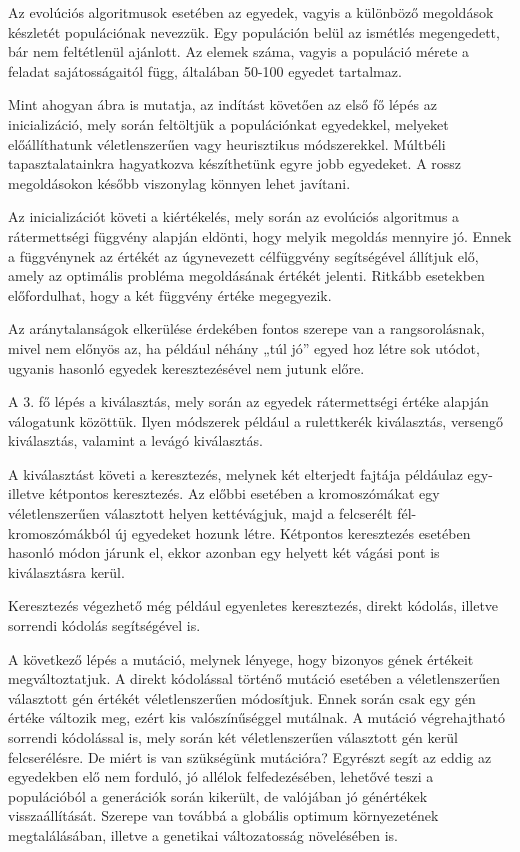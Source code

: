 \documentclass[12pt,a4paper,oneside]{report}
\begin{document}
Az evolúciós algoritmusok esetében az egyedek, vagyis a különböző megoldások készletét populációnak nevezzük. 
Egy populáción belül az ismétlés megengedett, bár nem feltétlenül ajánlott. 
Az elemek száma, vagyis a populáció mérete a feladat sajátosságaitól függ, általában 50-100 egyedet tartalmaz.


Mint ahogyan  ábra is mutatja, az indítást követően az első fő lépés az inicializáció, mely során feltöltjük a populációnkat egyedekkel, melyeket előállíthatunk véletlenszerűen vagy heurisztikus módszerekkel. 
Múltbéli tapasztalatainkra hagyatkozva készíthetünk egyre jobb egyedeket. 
A rossz megoldásokon később viszonylag könnyen lehet javítani. 

Az inicializációt követi a kiértékelés, mely során az evolúciós algoritmus a rátermettségi függvény alapján eldönti, hogy melyik megoldás mennyire jó.
Ennek a függvénynek az értékét az úgynevezett célfüggvény segítségével állítjuk elő, amely az optimális probléma megoldásának értékét jelenti. 
Ritkább esetekben előfordulhat, hogy a két függvény értéke megegyezik.

Az aránytalanságok elkerülése érdekében fontos szerepe van a rangsorolásnak, mivel nem előnyös az, ha például néhány „túl jó” egyed hoz létre sok utódot, ugyanis hasonló egyedek keresztezésével nem jutunk előre.

A 3. fő lépés a kiválasztás, mely során az egyedek rátermettségi értéke alapján válogatunk közöttük. 
Ilyen módszerek például a rulettkerék kiválasztás, versengő kiválasztás, valamint a levágó kiválasztás.

A kiválasztást követi a keresztezés, melynek két elterjedt fajtája példáulaz egy- illetve kétpontos keresztezés. 
Az előbbi esetében a kromoszómákat egy véletlenszerűen választott helyen kettévágjuk, majd a felcserélt fél-kromoszómákból új egyedeket hozunk létre. 
Kétpontos keresztezés esetében hasonló módon járunk el, ekkor azonban egy helyett két vágási pont is kiválasztásra kerül.



Keresztezés végezhető még például egyenletes keresztezés, direkt kódolás, illetve sorrendi kódolás segítségével is.

A következő lépés a mutáció, melynek lényege, hogy bizonyos gének értékeit megváltoztatjuk. 
A direkt kódolással történő mutáció esetében a véletlenszerűen választott gén értékét véletlenszerűen módosítjuk. 
Ennek során csak egy gén értéke változik meg, ezért kis valószínűséggel mutálnak. 
A mutáció végrehajtható sorrendi kódolással is, mely során két véletlenszerűen választott gén kerül felcserélésre. 
De miért is van szükségünk mutációra? 
Egyrészt segít az eddig az egyedekben elő nem forduló, jó allélok felfedezésében, lehetővé teszi a populációból a generációk során kikerült, de valójában jó génértékek visszaállítását. 
Szerepe van továbbá a globális optimum környezetének megtalálásában, illetve a genetikai változatosság növelésében is.
\end{document}
